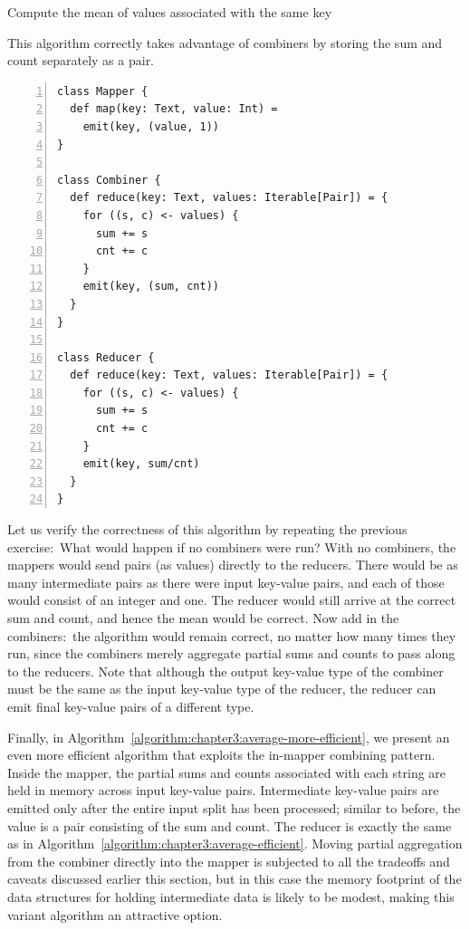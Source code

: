 \documentclass[11pt]{article}
\begin{document}
\begin{algorithm}[t]
\caption{Compute the mean of values associated with the same key}
\label{algorithm:chapter3:average-efficient}
This algorithm correctly takes advantage of combiners by storing the
sum and count separately as a pair.
\begin{small}
\begin{Verbatim}[numbers=left, xleftmargin=7.5mm]
class Mapper {
  def map(key: Text, value: Int) =
    emit(key, (value, 1))
}

class Combiner {
  def reduce(key: Text, values: Iterable[Pair]) = {
    for ((s, c) <- values) {
      sum += s
      cnt += c
    }
    emit(key, (sum, cnt))
  }
}

class Reducer {
  def reduce(key: Text, values: Iterable[Pair]) = {
    for ((s, c) <- values) {
      sum += s
      cnt += c
    }
    emit(key, sum/cnt)
  }
}
\end{Verbatim}
\end{small}
\end{algorithm}

Let us verify the correctness of this algorithm by repeating the
previous exercise:\ What would happen if no combiners were run?  With
no combiners, the mappers would send pairs (as values) directly to the
reducers.  There would be as many intermediate pairs as there were
input key-value pairs, and each of those would consist of an integer
and one.  The reducer would still arrive at the correct sum and count,
and hence the mean would be correct.  Now add in the combiners:\ the
algorithm would remain correct, no matter how many times they run,
since the combiners merely aggregate partial sums and counts to pass
along to the reducers.  Note that although the output key-value type
of the combiner must be the same as the input key-value type of the
reducer, the reducer can emit final key-value pairs of a different
type.

Finally, in Algorithm~\ref{algorithm:chapter3:average-more-efficient}, we
present an even more efficient algorithm that exploits the in-mapper
combining pattern.  Inside the mapper, the partial sums and counts
associated with each string are held in memory across input key-value
pairs.  Intermediate key-value pairs are emitted only after the entire
input split has been processed; similar to before, the value is a pair
consisting of the sum and count.  The reducer is exactly the same as
in Algorithm~\ref{algorithm:chapter3:average-efficient}.  Moving partial
aggregation from the combiner directly into the mapper is subjected to
all the tradeoffs and caveats discussed earlier this section, but in
this case the memory footprint of the data structures for holding
intermediate data is likely to be modest, making this variant
algorithm an attractive option.
\end{document}
